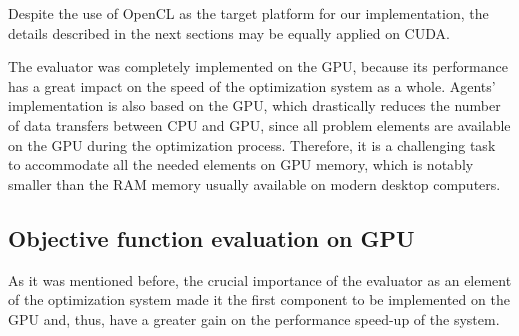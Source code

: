 Despite the use of OpenCL as the target platform for our implementation,
the details described in the next sections may be equally applied
on CUDA.

The evaluator was completely implemented on the GPU, because its performance
has a great impact on the speed of the optimization system as a whole.
Agents' implementation is also based on the GPU, which drastically
reduces the number of data transfers between CPU and GPU, since all
problem elements are available on the GPU during the optimization
process. Therefore, it is a challenging task to accommodate all the
needed elements on GPU memory, which is notably smaller than the RAM
memory usually available on modern desktop computers.


\subsection{Objective function evaluation on GPU \label{sub:Objective-function-evaluation}}

As it was mentioned before, the crucial importance of the evaluator
as an element of the optimization system made it the first component
to be implemented on the GPU and, thus, have a greater gain on the
performance speed-up of the system.

